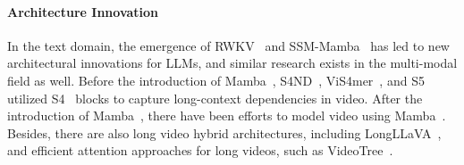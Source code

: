 \paragraph{Architecture Innovation} In the text domain, the emergence of RWKV~\citep{peng2023rwkv,choe2024rwkv} and SSM-Mamba~\citep{gu2020hippo,gu2023mamba,daotransformers} has led to new architectural innovations for LLMs, and similar research exists in the multi-modal field as well. Before the introduction of Mamba~\citep{gu2023mamba}, S4ND~\citep{nguyen2022s4nd}, ViS4mer~\citep{islam2022vis4mer}, and S5~\citep{wang2023s5} utilized S4~\citep{gu2021efficiently} blocks to capture long-context dependencies in video. After the introduction of Mamba~\citep{gu2023mamba}, there have been efforts to model video using Mamba~\citep{li2025videomamba,chen2024video}. Besides, there are also long video hybrid architectures, including LongLLaVA~\citep{wang2024longllava}, and efficient attention approaches for long videos, such as VideoTree~\citep{wang2024videotree}.





